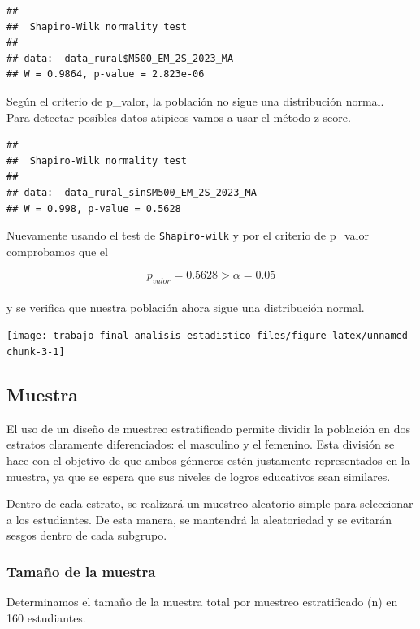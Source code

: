 \documentclass[
]{article}
\begin{document}
\begin{verbatim}
## 
##  Shapiro-Wilk normality test
## 
## data:  data_rural$M500_EM_2S_2023_MA
## W = 0.9864, p-value = 2.823e-06
\end{verbatim}

Según el criterio de p\_valor, la población no sigue una distribución
normal.\\
Para detectar posibles datos atipicos vamos a usar el método z-score.

\begin{verbatim}
## 
##  Shapiro-Wilk normality test
## 
## data:  data_rural_sin$M500_EM_2S_2023_MA
## W = 0.998, p-value = 0.5628
\end{verbatim}

Nuevamente usando el test de \texttt{Shapiro-wilk} y por el criterio de
p\_valor comprobamos que el

\[p_{valor}=0.5628>\alpha=0.05\]\\
y se verifica que nuestra población ahora sigue una distribución normal.

\begin{center}\texttt{[image: trabajo\_final\_analisis-estadistico\_files/figure-latex/unnamed-chunk-3-1]} \end{center}

\subsection*{Muestra}\label{muestra}

El uso de un diseño de muestreo estratificado permite dividir la
población en dos estratos claramente diferenciados: el masculino y el
femenino. Esta división se hace con el objetivo de que ambos génneros
estén justamente representados en la muestra, ya que se espera que sus
niveles de logros educativos sean similares.

Dentro de cada estrato, se realizará un muestreo aleatorio simple para
seleccionar a los estudiantes. De esta manera, se mantendrá la
aleatoriedad y se evitarán sesgos dentro de cada subgrupo.

\subsubsection*{Tamaño de la muestra}\label{tamauxf1o-de-la-muestra}

Determinamos el tamaño de la muestra total por muestreo estratificado
(n) en 160 estudiantes.
\end{document}
